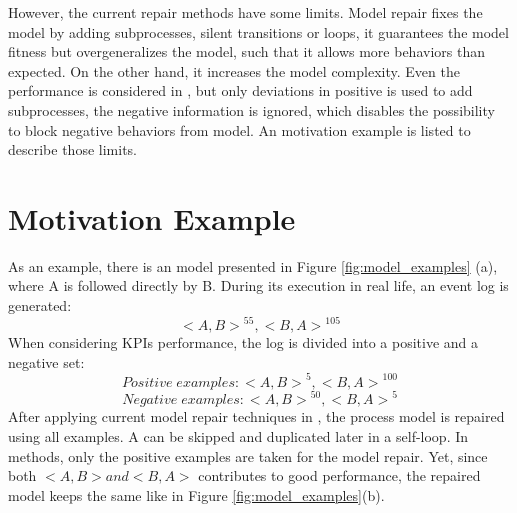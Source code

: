 However, the current repair methods have some limits. Model repair fixes the model by adding subprocesses, silent transitions or loops, it guarantees the model fitness but overgeneralizes the model, such that it allows more behaviors than expected. On the other hand, it increases the model complexity.  Even the performance is considered in \cite{dees2017enhancing}, but only deviations in positive is used to add subprocesses, the negative information is ignored, which disables the possibility to block negative behaviors from model.  An motivation example is listed to describe those limits.
\section{Motivation Example}
As an example, there is an model presented in Figure \ref{fig:model_examples} (a), where A is followed directly by B. During its execution in real life, an event log is generated: 
\[{ <A, B> }^{55}  , {<B, A>}^{105} \] 
When considering KPIs performance, the log is divided into a positive and a negative set: 
\[ Positive \;  examples: { <A, B> }^{5}  , {<B, A>}^{100} \] 
\[ Negative \; examples: { <A, B> }^{50}  , {<B, A>}^{5} \]  
After applying current model repair techniques in \cite{fahland2015model}, the process model is repaired using all examples. A can be skipped and duplicated later in a self-loop. In \cite{dees2017enhancing} methods, only the positive examples are taken for the model repair. Yet, since both $<A,B> and <B,A>$ contributes to good performance,  the repaired model keeps the same like in Figure \ref{fig:model_examples}(b).

